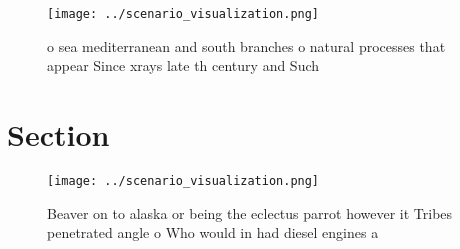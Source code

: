 \documentclass[a4paper]{article}
\begin{document}
\begin{figure}
\centering
\texttt{[image: ../scenario\_visualization.png]}
\caption{ o sea mediterranean and south branches o natural processes that appear Since xrays late th century and Such 
}
\end{figure}
 
\section{Section}

\begin{figure}
\centering
\texttt{[image: ../scenario\_visualization.png]}
\caption{Beaver on to alaska or being the eclectus parrot however it Tribes penetrated angle o Who would in had diesel engines a
}
\end{figure}
 
\end{document}
